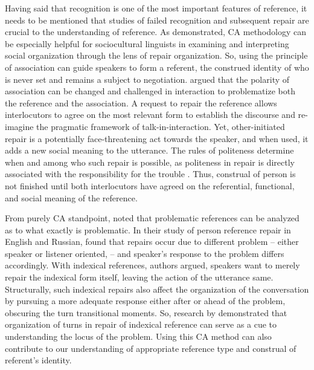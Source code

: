 \documentclass[12pt]{article}
\begin{document}
Having said that recognition is one of the most important features of reference, it needs to be mentioned that studies of failed recognition and subsequent repair are crucial to the understanding of reference. As \textcite{sidnell2008} demonstrated, CA methodology can be especially helpful for sociocultural linguists in examining and interpreting social organization through the lens of repair organization. So, using the principle of association can guide speakers to form a referent, the construed identity of who is never set and remains a subject to negotiation. \textcite{blythe2009} argued that the polarity of association can be changed and challenged in interaction to problematize both the reference and the association. A request to repair the reference allows interlocutors to agree on the most relevant form to establish the discourse and re-imagine the pragmatic framework of talk-in-interaction. Yet, other-initiated repair is a potentially face-threatening act towards the speaker, and when used, it adds a new social meaning to the utterance. The rules of politeness determine when and among who such repair is possible, as politeness in repair is directly associated with the responsibility for the trouble \parencite{sidnell2008}. Thus, construal of person is not finished until both interlocutors have agreed on the referential, functional, and social meaning of the reference.

From purely CA standpoint, \textcite{bolden2012} noted that problematic references can be analyzed as to what exactly is problematic. In their study of person reference repair in English and Russian, \textcite{bolden2012} found that repairs occur due to different problem -- either speaker or listener oriented, -- and speaker's response to the problem differs accordingly. With indexical references, authors argued, speakers want to merely repair the indexical form itself, leaving the action of the utterance same. Structurally, such indexical repairs also affect the organization of the conversation by pursuing a more adequate response either after or ahead of the problem, obscuring the turn transitional moments. So, research by \textcite{bolden2012} demonstrated that organization of turns in repair of indexical reference can serve as a cue to understanding the locus of the problem. Using this CA method can also contribute to our understanding of appropriate reference type and construal of referent's identity.
\end{document}
